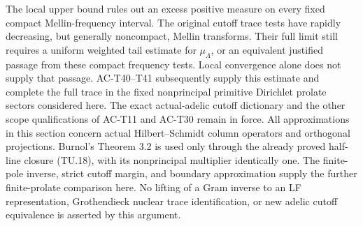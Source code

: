 \begin{remark}
The local upper bound rules out an excess positive measure
on every fixed compact Mellin-frequency interval.
The original cutoff trace tests have rapidly decreasing,
but generally noncompact, Mellin transforms.
Their full limit still requires a uniform weighted tail
estimate for \(\mu_\Lambda\), or an equivalent
justified passage from these compact frequency tests.
Local convergence alone does not supply that passage.
AC-T40--T41 subsequently supply this estimate and complete
the full trace in the fixed nonprincipal primitive
Dirichlet prolate sectors considered here.
The exact actual-adelic cutoff dictionary and the other
scope qualifications of AC-T11 and AC-T30 remain in force.
All approximations in this section concern actual
Hilbert--Schmidt column operators and orthogonal projections.
Burnol's Theorem 3.2 is used only through the already proved
half-line closure (TU.18), with its nonprincipal multiplier
identically one.  The finite-pole inverse, strict cutoff
margin, and boundary approximation supply the further
finite-prolate comparison here.
No lifting of a Gram inverse to an LF representation,
Grothendieck nuclear trace identification, or new adelic
cutoff equivalence is asserted by this argument.
\end{remark}
